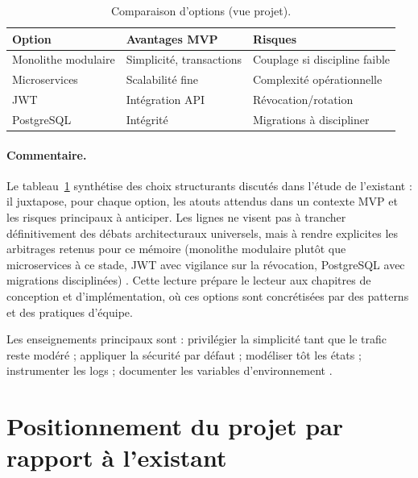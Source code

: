\begin{table}[htbp]
  \centering
  \renewcommand{\arraystretch}{1.4}
  \setlength{\tabcolsep}{10pt}
  \caption{Comparaison d'options (vue projet).}
  \label{tab:comparatif-existant}
  \begin{tabular}{|p{2.6cm}|p{4.8cm}|p{4.8cm}|}
    \hline
    \textbf{Option} & \textbf{Avantages MVP} & \textbf{Risques} \\
    \hline
    Monolithe modulaire & Simplicité, transactions & Couplage si discipline faible \\
    \hline
    Microservices & Scalabilité fine & Complexité opérationnelle \cite{newman2021} \\
    \hline
    JWT & Intégration API & Révocation/rotation \cite{rfc7519} \\
    \hline
    PostgreSQL & Intégrité & Migrations à discipliner \cite{kleppmann2017} \\
    \hline
  \end{tabular}
\end{table}

\paragraph{Commentaire.}
Le tableau~\ref{tab:comparatif-existant} synthétise des choix structurants discutés dans l'étude de l'existant : il juxtapose, pour chaque option, les atouts attendus dans un contexte MVP et les risques principaux à anticiper. Les lignes ne visent pas à trancher définitivement des débats architecturaux universels, mais à rendre explicites les arbitrages retenus pour ce mémoire (monolithe modulaire plutôt que microservices à ce stade, JWT avec vigilance sur la révocation, PostgreSQL avec migrations disciplinées) \cite{bass2021,newman2021,rfc7519,kleppmann2017}. Cette lecture prépare le lecteur aux chapitres de conception et d'implémentation, où ces options sont concrétisées par des patterns et des pratiques d'équipe.

Les enseignements principaux sont : privilégier la simplicité tant que le trafic reste modéré ; appliquer la sécurité par défaut \cite{owasp2021} ; modéliser tôt les états ; instrumenter les logs ; documenter les variables d'environnement \cite{twelvefactor}.

\section{Positionnement du projet par rapport à l'existant}

